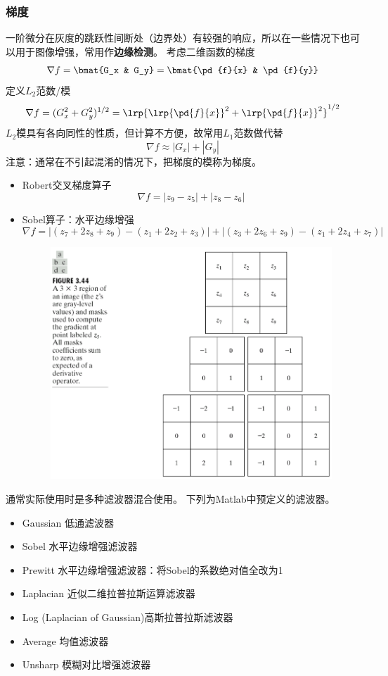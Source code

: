 \subsubsection{梯度}
一阶微分在灰度的跳跃性间断处（边界处）有较强的响应，所以在一些情况下也可以用于图像增强，常用作\textbf{边缘检测}。
考虑二维函数的梯度
\[\nabla f=\bmat{G_x & G_y}=\bmat{\pd{f}{x} & \pd{f}{y}}\]
定义$L_2$范数/模
\[\nabla f=(G_x^2+G_y^2)^{1/2}=\lrp{\lrp{\pd{f}{x}}^2+\lrp{\pd{f}{x}}^2}^{1/2}\]
$L_2$模具有各向同性的性质，但计算不方便，故常用$L_1$范数做代替
\[\nabla f\approx |G_x|+|G_y|\]
注意：通常在不引起混淆的情况下，把梯度的模称为梯度。
\begin{itemize}
\item Robert交叉梯度算子
\[\nabla f=|z_9-z_5|+|z_8-z_6|\]
\item Sobel算子：水平边缘增强
\[\nabla f=|(z_7+2z_8+z_9)-(z_1+2z_2+z_3)|+|(z_3+2z_6+z_9)-(z_1+2z_4+z_7)|\]
\begin{figure}[H]
\centering
\includegraphics[width=0.4\linewidth]{fig/sobel_and_robert.png}
\end{figure}
\end{itemize}

通常实际使用时是多种滤波器混合使用。
下列为Matlab中预定义的滤波器。
\begin{itemize}
\item Gaussian 低通滤波器
\item Sobel 水平边缘增强滤波器
\item Prewitt 水平边缘增强滤波器：将Sobel的系数绝对值全改为1
\item Laplacian 近似二维拉普拉斯运算滤波器
\item Log (Laplacian of Gaussian)高斯拉普拉斯滤波器
\item Average 均值滤波器
\item Unsharp 模糊对比增强滤波器
\end{itemize}